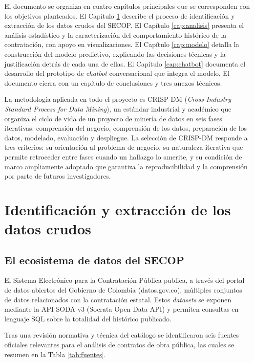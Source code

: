 \documentclass[12pt,letterpaper,oneside]{report}
\begin{document}
El documento se organiza en cuatro capítulos principales que se corresponden
con los objetivos planteados. El Capítulo \ref{cap:datos} describe el proceso
de identificación y extracción de los datos crudos del SECOP. El Capítulo
\ref{cap:analisis} presenta el análisis estadístico y la caracterización del
comportamiento histórico de la contratación, con apoyo en visualizaciones. El
Capítulo \ref{cap:modelo} detalla la construcción del modelo predictivo,
explicando las decisiones técnicas y la justificación detrás de cada una de
ellas. El Capítulo \ref{cap:chatbot} documenta el desarrollo del prototipo de
\emph{chatbot} conversacional que integra el modelo. El documento cierra con un
capítulo de conclusiones y tres anexos técnicos.

La metodología aplicada en todo el proyecto es CRISP-DM (\emph{Cross-Industry
Standard Process for Data Mining}), un estándar industrial y académico que
organiza el ciclo de vida de un proyecto de minería de datos en seis fases
iterativas: comprensión del negocio, comprensión de los datos, preparación de
los datos, modelado, evaluación y despliegue. La selección de CRISP-DM responde
a tres criterios: su orientación al problema de negocio, su naturaleza
iterativa que permite retroceder entre fases cuando un hallazgo lo amerite, y
su condición de marco ampliamente adoptado que garantiza la reproducibilidad y
la comprensión por parte de futuros investigadores.

\chapter{Identificación y extracción de los datos crudos}
\label{cap:datos}

\section{El ecosistema de datos del SECOP}

El Sistema Electrónico para la Contratación Pública publica, a través del
portal de datos abiertos del Gobierno de Colombia (datos.gov.co), múltiples
conjuntos de datos relacionados con la contratación estatal. Estos
\emph{datasets} se exponen mediante la API SODA v3 (Socrata Open Data API) y
permiten consultas en lenguaje SQL sobre la totalidad del histórico publicado.

Tras una revisión normativa y técnica del catálogo se identificaron seis
fuentes oficiales relevantes para el análisis de contratos de obra pública, las
cuales se resumen en la Tabla \ref{tab:fuentes}.
\end{document}
